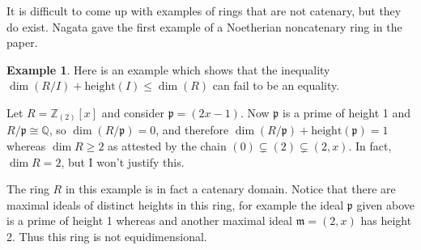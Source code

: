 \documentclass{amsart}[12pt]
\def\htt{\mathrm{height}}
\newcommand{\Q}{\mathbb{Q}}
\newcommand{\Z}{\mathbb{Z}}
\newcommand{\p}{{\mathfrak p}}
\newcommand{\m}{{\mathfrak m}}
\numberwithin{equation}{section}
\theoremstyle{plain} %
\newtheorem{lem}[equation]{Lemma}
\theoremstyle{definition}
\newtheorem{ex}[equation]{Example}
\theoremstyle{remark}
\newcommand{\Spec}{\mathrm{Spec}}
\begin{document}
It is difficult to come up with examples of rings that are not catenary, but they do exist. Nagata  gave the first example of a Noetherian noncatenary ring in the paper.



%
%

 
 \begin{ex}
 Here is an example which shows that  the inequality $\dim(R/I) + \mathrm{height}(I) \leq \dim(R)$  can fail to be an equality.
 
 Let $R=\Z_{(2)}[x]$ and consider $\p=(2x-1)$. Now $\p$ is a prime of height 1 and $R/\p\cong \Q$, so $\dim(R/\p)=0$, and therefore $\dim(R/\p)+\htt(\p)=1$ whereas $\dim R\geq 2$ as attested by the chain $(0)\subsetneq (2) \subsetneq (2,x)$.  In fact, $\dim R=2$, but I won't justify this. 
 
 The ring $R$ in this example is in fact a catenary domain.  Notice that there are maximal ideals of distinct heights in this ring, for example the ideal $\p$ given above is a prime of height 1 whereas and another maximal ideal $\m=(2,x)$ has height 2. Thus this ring is not equidimensional.
 
  \end{ex}
\end{document}
